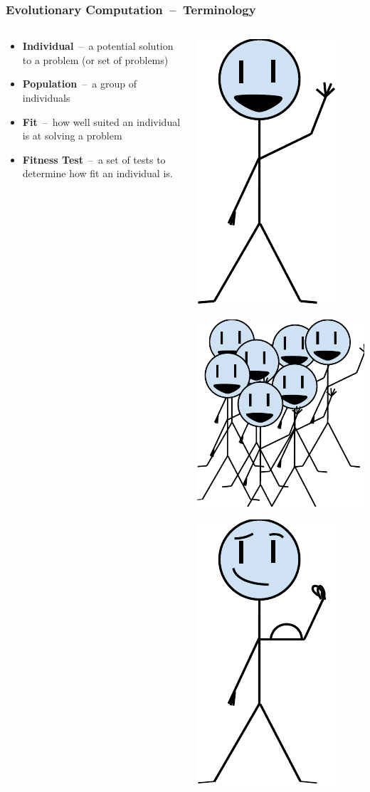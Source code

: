 \documentclass{beamer}
\newcommand{\linespace}{\vskip 0.25cm}
\begin{document}
\begin{frame}
	\frametitle{Evolutionary Computation~--~Terminology}
	\begin{columns}
		\begin{column}{0.7\textwidth}
			\begin{itemize}
				\item \textbf{Individual}~--~a potential solution to a problem (or set of problems)
				\linespace
				\linespace
				\linespace
				\item \textbf{Population}~--~a group of individuals
				\linespace
				\linespace
				\linespace
				\item \textbf{Fit}~--~how well suited an individual is at solving a problem
				\linespace
				\linespace
				\linespace
				\item \textbf{Fitness Test}~--~a set of tests to determine how fit an individual is.
			\end{itemize}
		\end{column}
		\begin{column}{0.3\textwidth}
			\includegraphics[width=.25\textwidth]{Illustrations/individual.PDF}
			\linespace

			\includegraphics[height=.4\textwidth]{Illustrations/population.PDF}
			\linespace

			\includegraphics[height=.5\textwidth]{Illustrations/fit.PDF}
			\linespace


\end{column}
\end{columns}
\end{frame}
\end{document}
